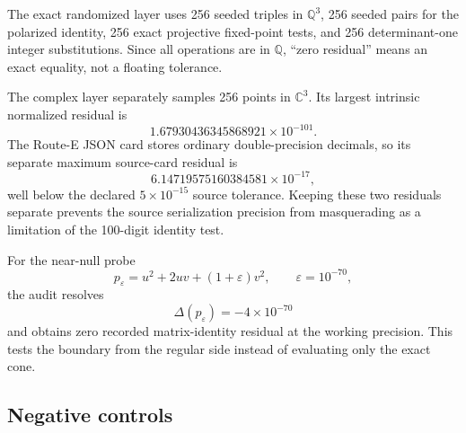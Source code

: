 \documentclass[11pt]{article}
\numberwithin{equation}{section}
\newcommand{\CC}{\mathbb C}
\newcommand{\QQ}{\mathbb Q}
\begin{document}
The exact randomized layer uses 256 seeded triples in \(\QQ^3\), 256 seeded
pairs for the polarized identity, 256 exact projective fixed-point tests, and
256 determinant-one integer substitutions.  Since all operations are in
\(\QQ\), ``zero residual'' means an exact equality, not a floating tolerance.

The complex layer separately samples 256 points in \(\CC^3\).  Its largest
intrinsic normalized residual is
\begin{equation}
 1.67930436345868921\times10^{-101}.
 \label{eq:intrinsic-residual}
\end{equation}
The Route-E JSON card stores ordinary double-precision decimals, so its
separate maximum source-card residual is
\begin{equation}
 6.14719575160384581\times10^{-17},
 \label{eq:source-residual}
\end{equation}
well below the declared \(5\times10^{-15}\) source tolerance.  Keeping these
two residuals separate prevents the source serialization precision from
masquerading as a limitation of the 100-digit identity test.

For the near-null probe
\begin{equation}
 p_\varepsilon=u^2+2uv+(1+\varepsilon)v^2,
 \qquad \varepsilon=10^{-70},
\end{equation}
the audit resolves
\begin{equation}
 \Delta(p_\varepsilon)=-4\times10^{-70}
\end{equation}
and obtains zero recorded matrix-identity residual at the working precision.
This tests the boundary from the regular side instead of evaluating only the
exact cone.

\subsection{Negative controls}
\end{document}
